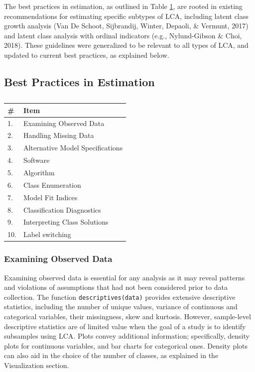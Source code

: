 \documentclass[
  ,man,floatsintext]{apa6}
\begin{document}
The best practices in estimation, as outlined in Table
\ref{tab:checkest-tab}, are rooted in existing recommendations
for estimating specific subtypes of LCA,
including latent
class growth analysis (Van De Schoot, Sijbrandij, Winter, Depaoli, \& Vermunt, 2017) and latent
class analysis with ordinal indicators (e.g., Nylund-Gibson \& Choi, 2018).
These guidelines were generalized to be relevant to all types of LCA,
and updated to current best practices, as explained below.

\hypertarget{best-practices-in-estimation}{%
\subsection{Best Practices in Estimation}\label{best-practices-in-estimation}}

\begin{table}

\caption{\label{tab:checkest-tab}}
\centering
\begin{tabular}[t]{l|l}
\hline
\# & Item\\
\hline
1. & Examining Observed Data\\
\hline
2. & Handling Missing Data\\
\hline
3. & Alternative Model Specifications\\
\hline
4. & Software\\
\hline
5. & Algorithm\\
\hline
6. & Class Enumeration\\
\hline
7. & Model Fit Indices\\
\hline
8. & Classification Diagnostics\\
\hline
9. & Interpreting Class Solutions\\
\hline
10. & Label switching\\
\hline
\end{tabular}
\end{table}

\hypertarget{examining-observed-data}{%
\subsubsection{Examining Observed Data}\label{examining-observed-data}}

Examining observed data is essential for any analysis as it may reveal
patterns and violations of assumptions that had not been considered
prior to data collection.
The function \texttt{descriptives(data)} provides extensive descriptive statistics,
including the number of unique values,
variance of continuous and categorical variables,
their missingness, skew and kurtosis.
However, sample-level descriptive statistics are of limited value when the goal of a study is to identify subsamples using LCA.
Plots convey additional information; specifically, density plots for continuous variables, and bar charts
for categorical ones.
Density plots can also aid in the choice of the number of classes, as explained in the Visualization section.
\end{document}
